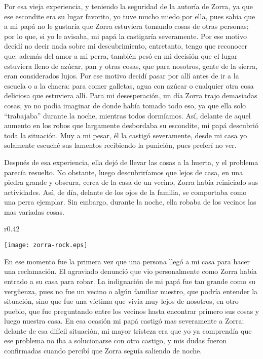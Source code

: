 Por esa vieja experiencia, y teniendo la seguridad de la autoría de Zorra, ya que ese escondite era su lugar favorito, yo tuve mucho miedo por ella, pues sabia que a mi papá no le gustaría que Zorra estuviera tomando cosas de otras personas; por lo que, si yo le avisaba, mi papá la castigaría severamente. Por ese motivo decidí no decir nada sobre mi descubrimiento, entretanto, tengo que reconocer que: además del amor a mi perra, también pesó en mi decisión que el lugar estuviera lleno de azúcar, pan y otras cosas, que para nosotros, gente de la sierra, eran considerados lujos.
Por ese motivo decidí pasar por allí antes de ir a la escuela o a la chacra: para comer galletas, agua con azúcar o cualquier otra cosa deliciosa que estuviera allí.
Para mi desesperación, un día Zorra trajo demasiadas cosas, yo no podía imaginar de donde había tomado todo eso, ya que ella solo ``trabajaba'' durante la noche, mientras todos dormíamos. Así, delante de aquel aumento en los robos que largamente desbordaba su escondite, mi papá descubrió toda la situación.
Muy a mi pesar, él la castigó severamente, desde mi casa yo solamente escuché sus lamentos recibiendo la punición, pues preferí no ver.


Después de esa experiencia, ella dejó de llevar las cosas a la huerta, y el problema parecía resuelto. No obstante, luego descubriríamos que lejos de casa, en una piedra grande y obscura, cerca de la casa de un vecino, 
Zorra había reiniciado sus actividades. Así, de día, delante de los ojos de la familia, se comportaba como una perra ejemplar. Sin embargo, durante la noche, ella robaba de los vecinos las mas variadas cosas.

\ifdefined\EnableIncludeImages
\begin{wrapfigure}{r}{0.42\textwidth}
  \begin{center}
  \vspace{-10pt}
    \texttt{[image: zorra-rock.eps]}
  \end{center}
  \vspace{-20pt}
\end{wrapfigure}
\fi
En ese momento fue la primera vez que una persona llegó a mi casa para hacer una reclamación. El agraviado denunció que vio personalmente como Zorra había entrado a su casa para robar.
La indignación de mi papá fue tan grande como su vergüenza, pues no fue un vecino o algún familiar nuestro, que podría entender la situación, sino que fue una víctima que vivía muy lejos de nosotros, en otro pueblo, que fue preguntando entre los vecinos hasta encontrar primero sus cosas y luego nuestra casa.
En esa ocasión mi papá castigó mas severamente a Zorra; delante de esa difícil situación, mi mayor tristeza era que yo ya comprendía que ese problema no iba a solucionarse con otro castigo, y mis dudas fueron confirmadas cuando percibí que Zorra seguía saliendo de noche.

